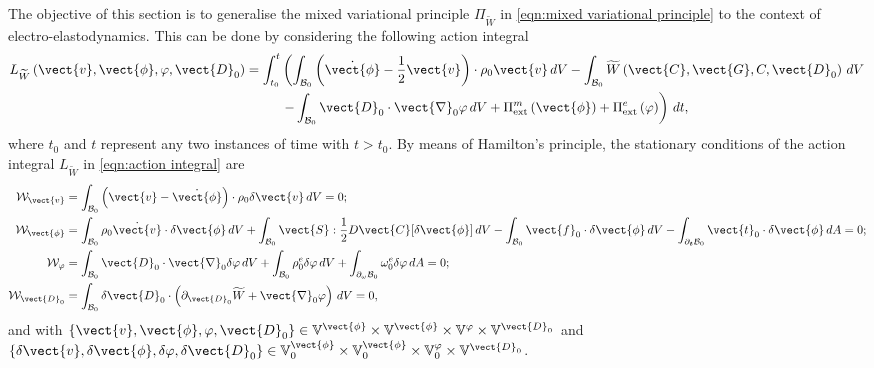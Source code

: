 The objective of this section is to generalise the mixed variational principle $\Pi_{\widetilde{W}}$ in \eqref{eqn:mixed variational principle} to the context of electro-elastodynamics. 
This can be done by considering the following action integral 
%
\begin{equation}\label{eqn:action integral}
\begin{aligned}
L_{\widetilde{W}}\left(\vect{v},\vect{\phi},\varphi,\vect{D}_0\right) = \int_{t_0}^{t}&\left(\int_{\mathcal{B}_0}\left(\dot{\vect{\phi}} - \frac{1}{2}{\vect{v}}\right)\cdot\rho_0{\vect{v}}\,dV - 
%
\int_{\mathcal{B}_0}\widetilde{W}\left(\vect{C},\vect{G},C,\vect{D}_0\right)\,dV\right.\\&\left. - \int_{\mathcal{B}_0}\vect{D}_0\cdot\vect{\nabla}_0\varphi\,dV + \Pi_{\text{ext}}^m\left(\vect{\phi}\right) + \Pi_{\text{ext}}^e\left(\varphi\right)
\right)\,dt,
\end{aligned}
\end{equation}
%
%
where $t_0$ and $t$ represent any two instances of time with $t>t_0$. 
By means of Hamilton's principle, the stationary conditions of the action integral $L_{\widetilde{W}}$ in \eqref{eqn:action integral} are
%
\begin{equation}\label{eqn:weak forms for the dynamic formulation}
\begin{aligned}
\mathcal{W}_{\vect{v}}&= \int_{\mathcal{B}_0}\left(\vect{v} - \dot{\vect{\phi}}\right)\cdot\rho_0\delta\vect{v}\,dV=0;\\
%
\mathcal{W}_{\vect{\phi}} &  = \int_{\mathcal{B}_0}\rho_0\dot{\vect{v}}\cdot\delta\vect{\phi}\,dV + \int_{\mathcal{B}_0}\vect{S}:\frac{1}{2}D\vect{C}[\delta\vect{\phi}]\,dV\-  -\int_{\mathcal{B}_0}\vect{f}_0\cdot\delta\vect{\phi}\,dV-
\int_{\partial_{\boldsymbol{t}}\mathcal{B}_0}\vect{t}_0\cdot\delta\vect{\phi}\,dA=0;\\
%
\mathcal{W}_{{\varphi}}& =  \int_{\mathcal{B}_0}\vect{D}_0\cdot\vect{\nabla}_0\delta\varphi\,dV+  \int_{\mathcal{B}_0}\rho_0^e\delta\varphi\,dV+
\int_{\partial_\omega\mathcal{B}_0}\omega^e_0\delta\varphi\,dA=0;\\
%
\mathcal{W}_{\vect{D}_0}& =   \int_{\mathcal{B}_0}\delta\vect{D}_0\cdot \left(\partial_{\vect{D}_0}\widetilde{W} + \vect{\nabla}_0\varphi\right)\,dV=0,
%
\end{aligned}
\end{equation}
%
and with
$\{\vect{v},\vect{\phi},\varphi,\vect{D}_0\}\in \mathbb{V}^{\vect{\phi}}\times\mathbb{V}^{\vect{\phi}}\times\mathbb{V}^{\varphi}\times\mathbb{V}^{\vect{D}_0}$ and  $\{\delta\vect{v},\delta\vect{\phi},\delta\varphi,\delta\vect{D}_0\}\in \mathbb{V}_0^{\vect{\phi}}\times\mathbb{V}_0^{\vect{\phi}}\times\mathbb{V}_0^{\varphi}\times\mathbb{V}^{\vect{D}_0}$. 
